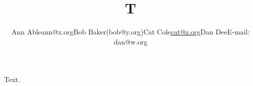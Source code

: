 \documentclass{article}
\begin{document}
\title{T}
\author{Ann Able\quad ann@x.org\quad Bob Baker\quad(bob@y.org)\quad Cat Cole\quad\href{mailto:cat@z.org}{cat@z.org}\quad Dan Dee\quad E-mail: dan@w.org}
\maketitle
Text.
\end{document}
